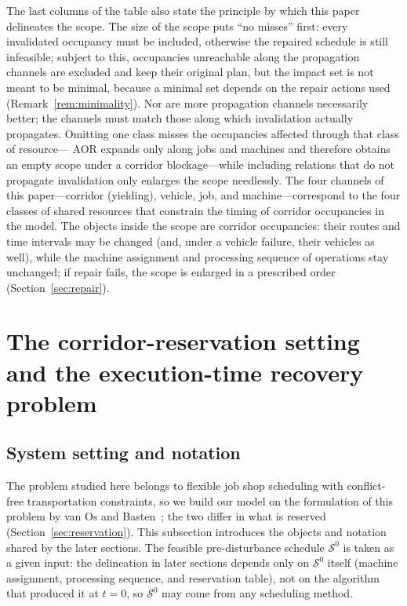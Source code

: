 \documentclass[manuscript,screen,review]{acmart}
\begin{document}
The last columns of the table also state the principle by which this paper delineates the scope. The size of the scope puts ``no misses'' first: every invalidated occupancy must be included,
otherwise the repaired schedule is still infeasible; subject to this, occupancies unreachable along the propagation channels are excluded and keep their original plan,
but the impact set is not meant to be minimal, because a minimal set depends on the repair actions used (Remark~\ref{rem:minimality}).
Nor are more propagation channels necessarily better; the channels must match those along which invalidation actually propagates. Omitting one class misses the occupancies affected through that class of resource---
AOR expands only along jobs and machines and therefore obtains an empty scope under a corridor blockage---while including relations that do not propagate invalidation only enlarges the scope needlessly.
The four channels of this paper---corridor (yielding), vehicle, job, and machine---correspond to the four classes of shared resources that constrain the timing of corridor occupancies in the model.
The objects inside the scope are corridor occupancies: their routes and time intervals may be changed (and, under a vehicle failure, their vehicles as well), while the machine assignment and processing sequence of operations stay unchanged;
if repair fails, the scope is enlarged in a prescribed order (Section~\ref{sec:repair}).

\section{The corridor-reservation setting and the execution-time recovery problem}
\label{sec:problem}

\subsection{System setting and notation}
\label{sec:system_brief}

The problem studied here belongs to flexible job shop scheduling with conflict-free transportation constraints,
so we build our model on the formulation of this problem by van Os and Basten~\cite{vanos2026exact}; the two differ in what is reserved (Section~\ref{sec:reservation}).
This subsection introduces the objects and notation shared by the later sections.
The feasible pre-disturbance schedule \(\mathcal{S}^0\) is taken as a given input:
the delineation in later sections depends only on \(\mathcal{S}^0\) itself (machine assignment, processing sequence, and reservation table),
not on the algorithm that produced it at \(t=0\), so \(\mathcal{S}^0\) may come from any scheduling method.
\end{document}
